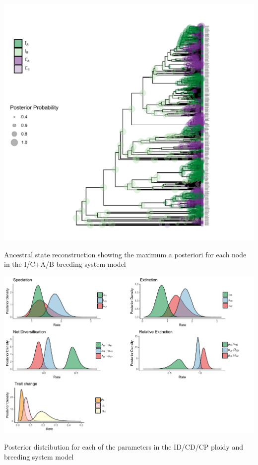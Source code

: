 \begin{suppfigure}
\includegraphics[width=\textwidth]{asrICAB.pdf}
\caption{Ancestral state reconstruction showing the maximum a posteriori for each node in the I/C+A/B breeding system model} %
\label{suppfigure:ICABasr}
\end{suppfigure}


\begin{suppfigure}
\includegraphics[width=\textwidth]{musseDPSInodipposteriordist.pdf}
\caption{Posterior distribution for each of the parameters in the ID/CD/CP ploidy and breeding system model} %
\label{suppfigure:IDCDCPnodip}
\end{suppfigure}

